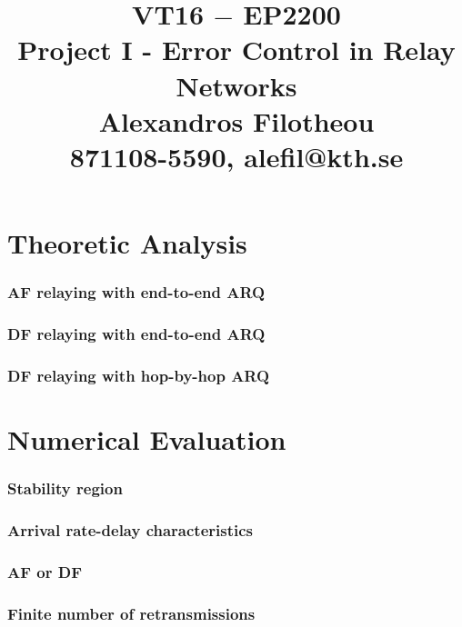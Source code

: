 \documentclass[a4paper,12pt,oneside,onecolumn]{article} %
\title{VT16 $-$ EP2200 \\
  Project I - Error Control in Relay Networks \\
  Alexandros Filotheou \\
  871108-5590, alefil@kth.se }
\date{}
\begin{document}
	\maketitle

  \part*{Theoretic Analysis}

    \section{AF relaying with end-to-end ARQ}
    

    \section{DF relaying with end-to-end ARQ}
    

    \section{DF relaying with hop-by-hop ARQ}
    


  \newpage
  \part*{Numerical Evaluation}

    \section{Stability region}
    

    \section*{Arrival rate-delay characteristics}
    

    \section*{AF or DF}
    

    \section*{Finite number of retransmissions}
    
\end{document}
